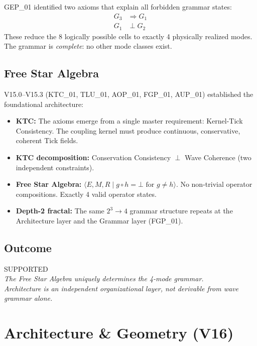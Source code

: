 \documentclass[11pt,a4paper,oneside]{report}
\newcommand{\supported}{\textcolor{supported}{SUPPORTED}}
\begin{document}
GEP\_01 identified two axioms that explain all forbidden grammar states:
\begin{align}
  G_3 &\Rightarrow G_1 \label{eq:ax1}\\
  G_1 &\perp G_2 \label{eq:ax2}
\end{align}
These reduce the 8 logically possible cells to exactly 4 physically
realized modes. The grammar is \textit{complete}: no other mode classes exist.

\subsection{Free Star Algebra}

V15.0--V15.3 (KTC\_01, TLU\_01, AOP\_01, FGP\_01, AUP\_01) established the
foundational architecture:

\begin{itemize}[nosep]
  \item \textbf{KTC:} The axioms emerge from a single master requirement:
    Kernel-Tick Consistency. The coupling kernel must produce continuous,
    conservative, coherent Tick fields.
  \item \textbf{KTC decomposition:} Conservation Consistency $\perp$
    Wave Coherence (two independent constraints).
  \item \textbf{Free Star Algebra:} $\langle E, M, R \mid g\circ h = \bot
    \text{ for } g\neq h\rangle$. No non-trivial operator compositions.
    Exactly 4 valid operator states.
  \item \textbf{Depth-2 fractal:} The same $2^3\rightarrow 4$ grammar
    structure repeats at the Architecture layer and the Grammar layer (FGP\_01).
\end{itemize}

\subsection{Outcome}

\begin{center}
\supported{}\\[4pt]
\textit{The Free Star Algebra uniquely determines the 4-mode grammar.}\\[2pt]
\textit{Architecture is an independent organizational layer, not derivable from wave grammar alone.}
\end{center}

\section{Architecture \& Geometry (V16)}\label{sec:architecture}
\end{document}
